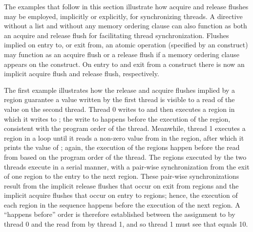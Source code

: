 The examples that follow in this section illustrate how acquire and release
flushes may be employed, implicitly or explicitly, for synchronizing threads. A
 directive without a list and without any memory ordering clause
can also function as both an acquire and release flush for facilitating thread
synchronization.  Flushes implied on entry to, or exit from, an atomic
operation (specified by an  construct) may function as an acquire
flush or a release flush if a memory ordering clause appears on the construct.
On entry to and exit from a  construct there is now an implicit
acquire flush and release flush, respectively.


The first example illustrates how the release and acquire flushes implied by a
 region guarantee a value written by the first thread is visible
to a read of the value on the second thread. Thread 0 writes to  and
then executes a  region in which it writes to ; the write
to  happens before the execution of the  region,
consistent with the program order of the thread.  Meanwhile, thread 1 executes a
 region in a loop until it reads a non-zero value from
 in the  region, after which it prints the value of
; again, the execution of the  regions happen before the
read from  based on the program order of the thread. The 
regions executed by the two threads execute in a serial manner, with a
pair-wise synchronization from the exit of one  region to the
entry to the next  region.  These pair-wise synchronizations
result from the implicit release flushes that occur on exit from
 regions and the implicit acquire flushes that occur on entry to
 regions; hence, the execution of each  region in
the sequence happens before the execution of the next  region.
A ``happens before'' order is therefore established between the assignment to 
by thread 0 and the read from  by thread 1, and so thread 1 must see that
 equals 10.

{}

